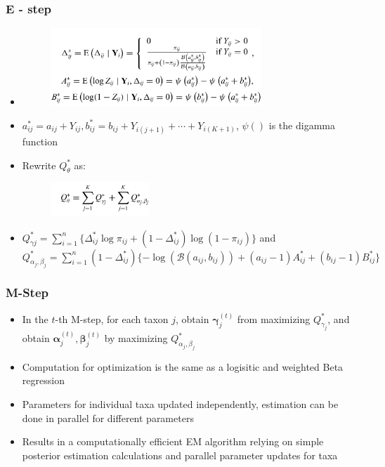 \documentclass{beamer}
\begin{document}
\begin{frame}
\frametitle{E - step}
\begin{itemize}
  \item
  \begin{figure}[!htb]
	\centering
	\includegraphics[width=0.75\textwidth]{img/2022.02.10_Zero_Inflated_generalized_Dirichlet_Multinomial-da36e885.png}
\end{figure}
\item $a_{ij}^* = a_{ij} + Y_{ij}, b_{ij}^* = b_{ij} + Y_{i(j+1)} + \cdots + Y_{i(K+1)}$, $\psi()$ is the digamma function
\item Rewrite $Q_\theta^*$ as:
 \begin{figure}[!htb]
	\centering
	\includegraphics[width=0.35\textwidth]{img/2022.02.10_Zero_Inflated_generalized_Dirichlet_Multinomial-f8a319cd.png}
\end{figure}
\item $Q_{\gamma j}^* = \sum_{i=1}^n\{ \Delta_{ij}^* \log \pi_{ij} + (1 - \Delta_{ij}^*) \log(1 - \pi_{ij})\}$  and $Q_{\alpha_j, \beta_j}^* = \sum_{i=1}^n(1 - \Delta_{ij}^*)\{- \log (\mathcal{B}(a_{ij}, b_{ij})) + (a_{ij}-1)A_{ij}^* + (b_{ij} - 1)B_{ij}^*\}$
\end{itemize}
\end{frame}

\begin{frame}
\frametitle{M-Step}
\begin{itemize}
  \item In the $t$-th M-step, for each taxon $j$, obtain $\boldsymbol\gamma_j^{(t)}$ from maximizing $Q_{\gamma_j}^*$, and obtain $\boldsymbol\alpha_j^{(t)}, \boldsymbol\beta_{j}^{(t)}$ by maximizing $Q_{\alpha_j, \beta_j}^*$
  \item Computation for optimization is the same as a logisitic and weighted Beta regression
  \item Parameters for individual taxa updated independently, estimation can be done in parallel for different parameters
  \item Results in a computationally efficient EM algorithm relying on simple posterior estimation calculations and parallel parameter updates for taxa
\end{itemize}
\end{frame}
\end{document}
